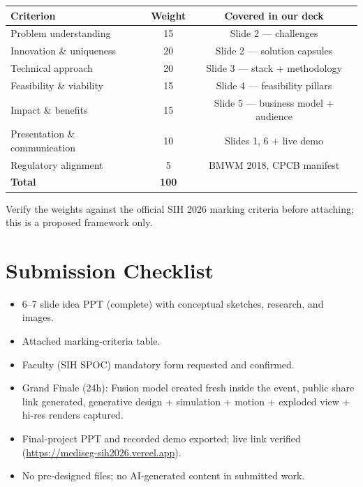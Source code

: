 \documentclass[11pt, a4paper]{article}
\begin{document}
\begin{tabularx}{\textwidth}{lcc}
  \toprule
  \textbf{Criterion} & \textbf{Weight} & \textbf{Covered in our deck}\\
  \midrule
  Problem understanding & 15 & Slide 2 --- challenges\\
  Innovation \& uniqueness & 20 & Slide 2 --- solution capsules\\
  Technical approach & 20 & Slide 3 --- stack + methodology\\
  Feasibility \& viability & 15 & Slide 4 --- feasibility pillars\\
  Impact \& benefits & 15 & Slide 5 --- business model + audience\\
  Presentation \& communication & 10 & Slides 1, 6 + live demo\\
  Regulatory alignment & 5 & BMWM 2018, CPCB manifest\\
  \midrule
  \textbf{Total} & \textbf{100} & \\
  \bottomrule
\end{tabularx}

\begin{flagbox}
Verify the weights against the official SIH 2026 marking criteria before
attaching; this is a proposed framework only.
\end{flagbox}

\section{Submission Checklist}

\begin{itemize}[leftmargin=1.6em, itemsep=2pt]
  \item 6--7 slide idea PPT (complete) with conceptual sketches, research,
        and images.
  \item Attached marking-criteria table.
  \item Faculty (SIH SPOC) mandatory form requested and confirmed.
  \item Grand Finale (24h): Fusion model created fresh inside the event,
        public share link generated, generative design + simulation + motion +
        exploded view + hi-res renders captured.
  \item Final-project PPT and recorded demo exported; live link verified
        (\url{https://mediseg-sih2026.vercel.app}).
  \item No pre-designed files; no AI-generated content in submitted work.
\end{itemize}
\end{document}

